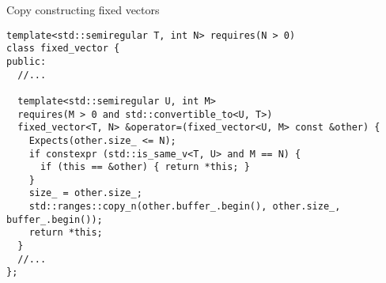\begin{frame}[t,fragile]
\begin{block}{Copy constructing fixed vectors}
\begin{lstlisting}
template<std::semiregular T, int N> requires(N > 0)
class fixed_vector {
public:
  //...

  template<std::semiregular U, int M>
  requires(M > 0 and std::convertible_to<U, T>)
  fixed_vector<T, N> &operator=(fixed_vector<U, M> const &other) {
    Expects(other.size_ <= N);
    if constexpr (std::is_same_v<T, U> and M == N) {
      if (this == &other) { return *this; }
    }
    size_ = other.size_;
    std::ranges::copy_n(other.buffer_.begin(), other.size_, buffer_.begin());
    return *this;
  }
  //...
};
\end{lstlisting}
\end{block}
\end{frame}
